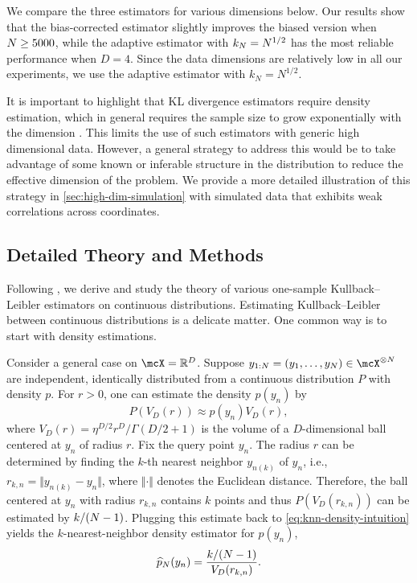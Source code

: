 We compare the three estimators for various dimensions below.
Our results show that the bias-corrected estimator slightly improves the biased version when $N \ge 5000$,
while the adaptive estimator with $k_N = N^{1/2}$ has the most reliable performance  when $D=4$.
Since the data dimensions are relatively low in all our experiments, we use the adaptive estimator with $k_N=N^{1/2}$. %

It is important to highlight that KL divergence estimators require density estimation, which in general requires the sample size to grow exponentially with the dimension \citep{Donoho:2000}.
This limits the use of such estimators with generic high dimensional data.
However, a general strategy to address this would be to take advantage of some known or inferable
structure in the distribution to reduce the effective dimension of the problem.
We provide a more detailed illustration of this strategy in \cref{sec:high-dim-simulation} with simulated data that exhibits weak correlations across coordinates.

\subsection{Detailed Theory and Methods}

Following \citet{Wang:2009}, we derive and study the theory of various one-sample Kullback--Leibler estimators on continuous distributions. Estimating Kullback--Leibler between continuous distributions is a delicate matter.
One common way is to start with density estimations.

Consider a general case on $\mcX = \reals^{D}$.
Suppose $y_{1:\numobs} = (y_1, \ldots, y_{\numobs}) \in \mcX^{\otimes \numobs}$ are independent,
identically distributed from a continuous distribution $P$ with density $p$.
For $r>0$, one can estimate the density $p(y_n)$ by
\begin{equation}
	P(V_{D}(r)) \approx p(y_{n}) V_{D}(r),
	\label{eq:knn-density-intuition}
\end{equation}
where $V_{D}(r) = \eta^{D/2}r^D/\Gamma(D/2+1)$ is the volume of a $D$-dimensional ball centered at $y_{n}$ of radius $r$.
Fix the query point $y_{n}$.
The radius $r$ can be determined by finding the $k$-th nearest neighbor $y_{n(k)}$ of $y_{n}$, i.e., $r_{k,n} = \Vert y_{n(k)} - y_n\Vert$, where $\Vert \cdot \Vert$ denotes the Euclidean distance.
Therefore, the ball centered at $y_{n}$ with radius $r_{k,n}$ contains $k$ points and thus $P(V_{D}(r_{k,n}))$ can be estimated by $k/(N-1)$.
Plugging this estimate back to \cref{eq:knn-density-intuition} yields the $k$-nearest-neighbor density estimator for $p(y_n)$,
\begin{equation}
	\widehat{p}_{\numobs}(y_n) = \frac{k/(\numobs-1)}{V_{D}(r_{k,n})}.
	\label{eq:knn-density-est-p}
\end{equation}

